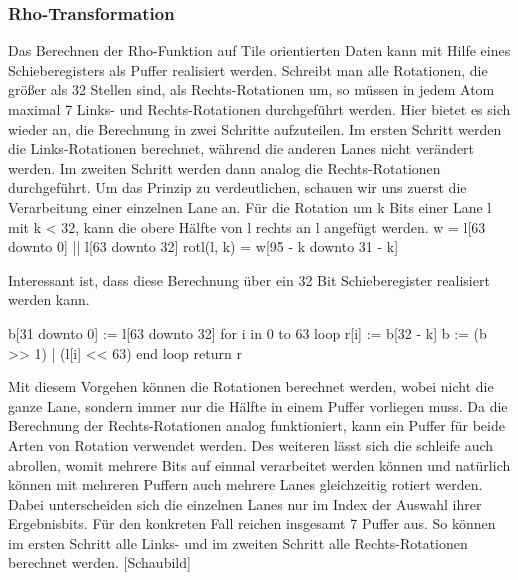 \subsubsection{Rho-Transformation}

Das Berechnen der Rho-Funktion auf Tile orientierten Daten kann mit Hilfe eines Schieberegisters als Puffer realisiert werden.
Schreibt man alle Rotationen, die größer als 32 Stellen sind, als Rechts-Rotationen um, so müssen in jedem Atom maximal 7 Links- und Rechts-Rotationen durchgeführt werden.
Hier bietet es sich wieder an, die Berechnung in zwei Schritte aufzuteilen. Im ersten Schritt werden die Links-Rotationen berechnet, während die anderen Lanes nicht verändert werden.
Im zweiten Schritt werden dann analog die Rechts-Rotationen durchgeführt. Um das Prinzip zu verdeutlichen, schauen wir uns zuerst die Verarbeitung einer einzelnen Lane an.
Für die Rotation um k Bits einer Lane l mit k < 32, kann die obere Hälfte von l rechts an l angefügt werden.
w = l[63 downto 0] || l[63 downto 32]
rotl(l, k) = w[95 - k downto 31 - k]

Interessant ist, dass diese Berechnung über ein 32 Bit Schieberegister realisiert werden kann.

b[31 downto 0] := l[63 downto 32]
for i in 0 to 63 loop
    r[i] := b[32 - k]
    b := (b >> 1) | (l[i] << 63)
end loop
return r

Mit diesem Vorgehen können die Rotationen berechnet werden, wobei nicht die ganze Lane, sondern immer nur die Hälfte in einem Puffer vorliegen muss.
Da die Berechnung der Rechts-Rotationen analog funktioniert, kann ein Puffer für beide Arten von Rotation verwendet werden.
Des weiteren lässt sich die schleife auch abrollen, womit mehrere Bits auf einmal verarbeitet werden können und natürlich können mit mehreren Puffern auch
mehrere Lanes gleichzeitig rotiert werden. Dabei unterscheiden sich die einzelnen Lanes nur im Index der Auswahl ihrer Ergebnisbits.
Für den konkreten Fall reichen insgesamt 7 Puffer aus. So können im ersten Schritt alle Links- und im zweiten Schritt alle Rechts-Rotationen berechnet werden.
[Schaubild]

